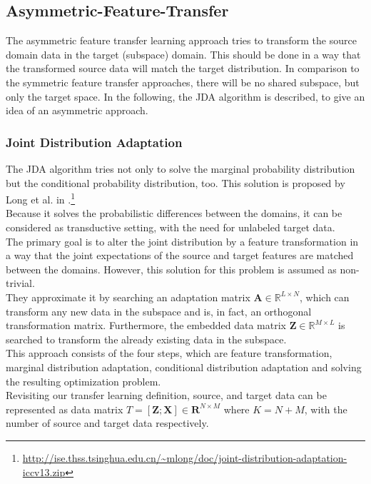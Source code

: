 \subsection{Asymmetric-Feature-Transfer}\label{TlSubSecHomoAsymFeature}
The asymmetric feature transfer learning approach tries to transform the source domain data in the target (subspace) domain.
This should be done in a way that the transformed source data will match the target distribution.
In comparison to the symmetric feature transfer approaches, there will be no shared subspace, but only the target space.
In the following, the \ac{JDA} algorithm is described, to give an idea of an asymmetric approach.\cite[p. 6; 10]{Weiss.2016}
\subsubsection{Joint Distribution Adaptation}
The \acl{JDA} algorithm tries not only to solve the marginal probability distribution but the conditional probability distribution, too.
This solution is proposed by Long et al. in \cite{Long.}.\footnote{\url{http://ise.thss.tsinghua.edu.cn/~mlong/doc/joint-distribution-adaptation-iccv13.zip}}\\
Because it solves the probabilistic differences between the domains, it can be considered as transductive setting, with the need for unlabeled target data.\\
The primary goal is to alter the joint distribution by a feature transformation in a way that the joint expectations of the source and target features are matched between the domains.
However, this solution for this problem is assumed as non-trivial.\cite{Long.}\\
They approximate it by searching an adaptation matrix $\mathbf{A} \in \mathbb{R}^{L \times N }$, which can transform any new data in the subspace and is, in fact, an orthogonal transformation matrix.
Furthermore, the embedded data matrix $\mathbf{Z} \in \mathbb{R}^{M\times L}$ is searched to transform the already existing data in the subspace.\cite{Long.}\\
This approach consists of the four steps, which are feature transformation, marginal distribution adaptation, conditional distribution adaptation and solving the resulting optimization problem.\cite{Long.}\\
Revisiting our transfer learning definition, source, and target data can be represented as data matrix $T = [\mathbf{Z};\mathbf{X}] \in \mathbf{R}^{N\times M}$ where $K = N+M$, with the number of source and target data respectively.
